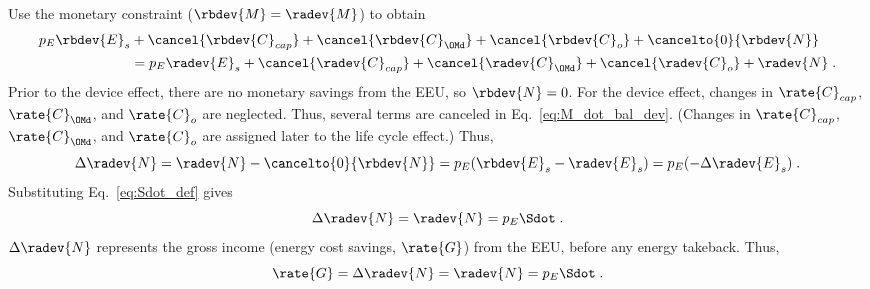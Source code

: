 \begin{landscape}
{    Use the monetary constraint ($\rbdev{M} = \radev{M}$) to obtain
  \begin{align} \label{eq:M_dot_bal_dev}
  p_E \rbdev{E}_s &+ \cancel{\rbdev{C}_{cap}} + \cancel{\rbdev{C}_{\OMd}} + \cancel{\rbdev{C}_o} + \cancelto{0}{\rbdev{N}} \nonumber \\
  &= p_E \radev{E}_s + \cancel{\radev{C}_{cap}} + \cancel{\radev{C}_{\OMd}} + \cancel{\radev{C}_o}  + \radev{N} \; .
  \end{align}
  Prior to the device effect, there are no monetary savings from the EEU, so $\rbdev{N} = 0$.
  For the device effect, 
  changes in $\rate{C}_{cap}$, $\rate{C}_{\OMd}$, and $\rate{C}_o$ are neglected.
  Thus, several terms are canceled in Eq.~\ref{eq:M_dot_bal_dev}.
  (Changes in $\rate{C}_{cap}$, $\rate{C}_{\OMd}$, and $\rate{C}_o$ 
      are assigned later to the life cycle effect.)
  Thus, 
  \begin{equation}
  \Delta \radev{N} = \radev{N} - \cancelto{0}{\rbdev{N}} = p_E(\rbdev{E}_s - \radev{E}_s) = p_E (-\Delta \radev{E}_s) \; .
  \end{equation}
  Substituting Eq.~\ref{eq:Sdot_def} gives
  \begin{equation}
  \Delta \radev{N} = \radev{N} = p_E \Sdot \; .
  \end{equation}
  $\Delta \radev{N}$ represents the gross income (energy cost savings, $\rate{G}$) from the EEU, 
  before any energy takeback. 
  Thus, 
  \begin{equation} \label{eq:G_dot}
  \rate{G} = \Delta \radev{N} = \radev{N} = p_E \Sdot \; .
  \end{equation}
}

\end{landscape}